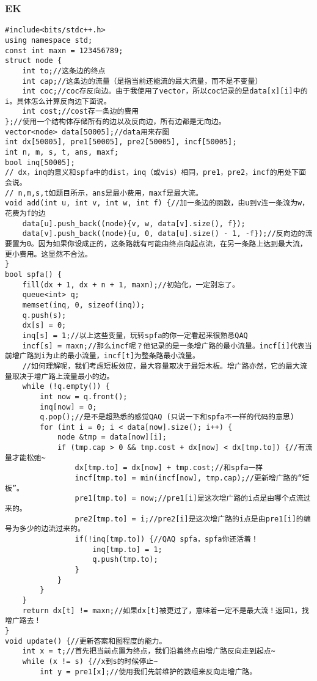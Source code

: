 \subsubsection{EK}
\begin{lstlisting}
#include<bits/stdc++.h>
using namespace std;
const int maxn = 123456789;
struct node {
	int to;//这条边的终点 
	int cap;//这条边的流量（是指当前还能流的最大流量，而不是不变量） 
	int coc;//coc存反向边。由于我使用了vector，所以coc记录的是data[x][i]中的i。具体怎么计算反向边下面说。 
	int cost;//cost存一条边的费用 
};//使用一个结构体存储所有的边以及反向边，所有边都是无向边。 
vector<node> data[50005];//data用来存图 
int dx[50005], pre1[50005], pre2[50005], incf[50005];
int n, m, s, t, ans, maxf;
bool inq[50005];
// dx，inq的意义和spfa中的dist，inq（或vis）相同，pre1，pre2，incf的用处下面会说。
// n,m,s,t如题目所示，ans是最小费用，maxf是最大流。 
void add(int u, int v, int w, int f) {//加一条边的函数，由u到v连一条流为w，花费为f的边 
	data[u].push_back((node){v, w, data[v].size(), f});
	data[v].push_back((node){u, 0, data[u].size() - 1, -f});//反向边的流要置为0。因为如果你设成正的，这条路就有可能由终点向起点流，在另一条路上达到最大流，更小费用。这显然不合法。
}
bool spfa() {
	fill(dx + 1, dx + n + 1, maxn);//初始化，一定别忘了。 
	queue<int> q;
	memset(inq, 0, sizeof(inq));
	q.push(s);
	dx[s] = 0;
	inq[s] = 1;//以上这些变量，玩转spfa的你一定看起来很熟悉QAQ 
	incf[s] = maxn;//那么incf呢？他记录的是一条增广路的最小流量。incf[i]代表当前增广路到i为止的最小流量，incf[t]为整条路最小流量。 
	//如何理解呢，我们考虑短板效应，最大容量取决于最短木板。增广路亦然，它的最大流量取决于增广路上流量最小的边。 
	while (!q.empty()) {
		int now = q.front();
		inq[now] = 0;
		q.pop();//是不是超熟悉的感觉QAQ (只说一下和spfa不一样的代码的意思)
		for (int i = 0; i < data[now].size(); i++) {
			node &tmp = data[now][i];
			if (tmp.cap > 0 && tmp.cost + dx[now] < dx[tmp.to]) {//有流量才能松弛~ 
				dx[tmp.to] = dx[now] + tmp.cost;//和spfa一样 
				incf[tmp.to] = min(incf[now], tmp.cap);//更新增广路的“短板”。
				pre1[tmp.to] = now;//pre1[i]是这次增广路的i点是由哪个点流过来的。 
				pre2[tmp.to] = i;//pre2[i]是这次增广路的i点是由pre1[i]的编号为多少的边流过来的。 
				if(!inq[tmp.to]) {//QAQ spfa，spfa你还活着！ 
					inq[tmp.to] = 1;
					q.push(tmp.to);
				}
			}
		}
	}
	return dx[t] != maxn;//如果dx[t]被更过了，意味着一定不是最大流！返回1，找增广路去！ 
}
void update() {//更新答案和图程度的能力。 
	int x = t;//首先把当前点置为终点，我们沿着终点由增广路反向走到起点~ 
	while (x != s) {//x到s的时候停止~ 
		int y = pre1[x];//使用我们先前维护的数组来反向走增广路。 

\end{lstlisting}

